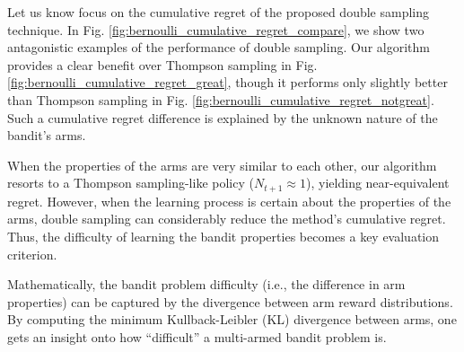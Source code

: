 \documentclass[10pt]{article}
\newcommand{\ie}{i.e., }
\begin{document}
Let us know focus on the cumulative regret of the proposed double sampling technique. In Fig. \ref{fig:bernoulli_cumulative_regret_compare}, we show two antagonistic examples of the performance of double sampling. Our algorithm provides a clear benefit over Thompson sampling in Fig. \ref{fig:bernoulli_cumulative_regret_great}, though it performs only slightly better than Thompson sampling in Fig. \ref{fig:bernoulli_cumulative_regret_notgreat}. Such a cumulative regret difference is explained by the unknown nature of the bandit's arms.

When the properties of the arms are very similar to each other, our algorithm resorts to a Thompson sampling-like policy ($N_{t+1}\approx1$), yielding near-equivalent regret. However, when the learning process is certain about the properties of the arms, double sampling can considerably reduce the method's cumulative regret. Thus, the difficulty of learning the bandit properties becomes a key evaluation criterion.

Mathematically, the bandit problem difficulty (\ie the difference in arm properties) can be captured by the divergence between arm reward distributions. By computing the minimum Kullback-Leibler (KL) divergence between arms, one gets an insight onto how ``difficult'' a multi-armed bandit problem is.
\end{document}
